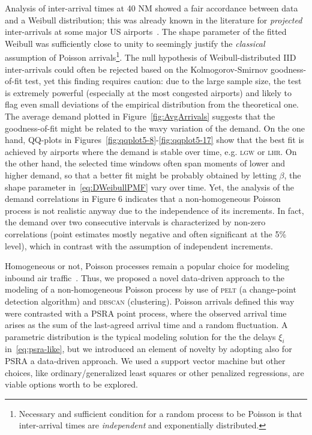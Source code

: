 \documentclass[final,review]{elsarticle}
\makeatletter
\newcommand*{\eg}{e.g.\@\xspace}
\newcommand{\PELT}{\textsc{pelt}}
\newcommand{\DBSCAN}{\textsc{dbscan}}
\newcommand{\airp}[1]{\textcolor{#1}{\textsc{#1}}}
\makeatother
\begin{document}
  Analysis of inter-arrival times at 40 NM showed a fair accordance between data and a Weibull distribution; this was already known in the literature for \emph{projected} inter-arrivals at some major US airports~\citep{willemain2004statistical}.
  The shape parameter of the fitted Weibull was sufficiently close to unity to seemingly justify the \emph{classical} assumption of Poisson arrivals\footnote{Necessary and sufficient condition for a random process to be Poisson is that inter-arrival times are \emph{independent} and exponentially distributed.}.
  The null hypothesis of Weibull-distributed \ac{IID} inter-arrivals could often be rejected based on the Kolmogorov-Smirnov goodness-of-fit test, yet this finding requires caution: due to the large sample size, the test is extremely powerful (especially at the most congested airports) and likely to flag even small deviations of the empirical distribution from the theoretical one.
  The average demand plotted in Figure~\ref{fig:AvgArrivals} suggests that the goodness-of-fit might be related to the wavy variation of the demand.
  On the one hand, QQ-plots in Figures~\ref{fig:qqplot5-8}-\ref{fig:qqplot5-17} show that the best fit is achieved by airports where the demand is stable over time, \eg{} \airp{lgw} or \airp{lhr}.
  On the other hand, the selected time windows often span moments of lower and higher demand, so that a better fit might be probably obtained by letting $\beta$, the shape parameter in~\eqref{eq:DWeibullPMF} vary over time.
  Yet, the analysis of the demand correlations in Figure 6 indicates that a non-homogeneous Poisson process is not realistic anyway due to the independence of its increments. In fact, the demand over two consecutive intervals is characterized by non-zero correlations (point estimates mostly negative and often significant at the 5\% level), which in contrast with the assumption of independent increments.

  Homogeneous or not, Poisson processes remain a popular choice for modeling inbound air traffic~\citep{gwiggner2014data}.
  Thus, we proposed a novel data-driven approach to the modeling of a non-homogeneous Poisson process by use of \PELT{} (a change-point detection algorithm) and \DBSCAN{} (clustering).
  Poisson arrivals defined this way were contrasted with a \ac{PSRA} point process, where the observed arrival time arises as the sum of the last-agreed arrival time and a random fluctuation.
  A parametric distribution is the typical modeling solution for the the delays \(\xi_i\) in~\eqref{eq:psra-like}, but we introduced an element of novelty by adopting also for \ac{PSRA} a data-driven approach.
  We used a support vector machine but other choices, like ordinary/generalized least squares or other penalized regressions, are viable options worth to be explored.
\end{document}
